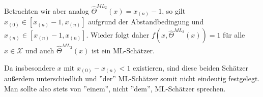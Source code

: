 \documentclass[a4paper]{article}
\begin{document}
\begin{enumerate}
    Betrachten wir aber analog $\hat{\Theta}^{ML_2}(x) = x_{(n)} - 1$, so gilt $x_{(0)} \in [x_{(n)} - 1, x_{(n)}]$ aufgrund der Abstandbedingung und $x_{(n)} \in [x_{(n)} - 1, x_{(n)}]$.
    Wieder folgt daher $f(x, \hat{\Theta}^{ML_2}(x)) = 1$ für alle $x \in \mathcal{X}$ und auch $\hat{\Theta}^{ML_2}(x)$ ist ein ML-Schätzer.

    Da insbesondere $x$ mit $x_{(0)} - x_{(n)} < 1$ existieren, sind diese beiden Schätzer außerdem unterschiedlich und ''der'' ML-Schätzer somit nicht eindeutig festgelegt. Man sollte also stets von ''einem'', nicht ''dem'', ML-Schätzer sprechen.
\end{enumerate}
\end{document}

